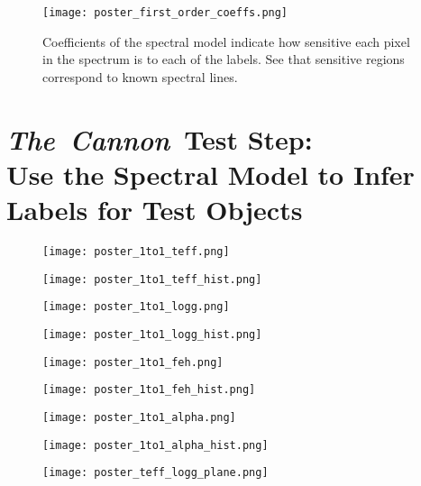 \documentclass[12pt, preprint]{aastex}
\newcommand{\tc}{\textsl{The~Cannon}}
\begin{document}
\begin{figure}[!htbp]
\centering
\texttt{[image: poster\_first\_order\_coeffs.png]}
\caption{Coefficients of the spectral model indicate how sensitive each pixel in the spectrum is to each of the labels. See that sensitive regions correspond to known spectral lines.}
\label{leading_coeffs}
\end{figure}

\section{\tc\ Test Step: \\ Use the Spectral Model to Infer Labels for Test Objects}

\begin{figure}
\centering
\texttt{[image: poster\_1to1\_teff.png]}
\end{figure}

\begin{figure}[!htbp]
\centering
\texttt{[image: poster\_1to1\_teff\_hist.png]}
\end{figure}

\begin{figure}[!htbp]
\centering
\texttt{[image: poster\_1to1\_logg.png]}
\end{figure}

\begin{figure}[!htbp]
\centering
\texttt{[image: poster\_1to1\_logg\_hist.png]}
\end{figure}

\begin{figure}[!htbp]
\centering
\texttt{[image: poster\_1to1\_feh.png]}
\end{figure}

\begin{figure}[!htbp]
\centering
\texttt{[image: poster\_1to1\_feh\_hist.png]}
\end{figure}

\begin{figure}[!htbp]
\centering
\texttt{[image: poster\_1to1\_alpha.png]}
\end{figure}

\begin{figure}[!htbp]
\centering
\texttt{[image: poster\_1to1\_alpha\_hist.png]}
\end{figure}

\begin{figure}[!htbp]
\centering
\texttt{[image: poster\_teff\_logg\_plane.png]}
\end{figure}
\end{document}
